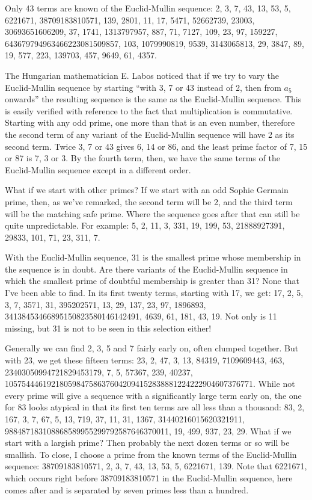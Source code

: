 \documentclass[12pt]{article}
\begin{document}
Only 43 terms are known of the Euclid-Mullin sequence: 2, 3, 7, 43, 13, 53, 5, 6221671, 38709183810571, 139, 2801, 11, 17, 5471, 52662739, 23003, 30693651606209, 37, 1741, 1313797957, 887, 71, 7127, 109, 23, 97, 159227, 643679794963466223081509857, 103, 1079990819, 9539, 3143065813, 29, 3847, 89, 19, 577, 223, 139703, 457, 9649, 61, 4357.

The Hungarian mathematician E. Labos noticed that if we try to vary the Euclid-Mullin sequence by starting ``with 3, 7 or 43 instead of 2, then from $a_5$ onwards'' the resulting sequence is the same as the Euclid-Mullin sequence. This is easily verified with reference to the fact that multiplication is commutative. Starting with any odd prime, one more than that is an even number, therefore the second term of any variant of the Euclid-Mullin sequence will have 2 as its second term. Twice 3, 7 or 43 gives 6, 14 or 86, and the least prime factor of 7, 15 or 87 is 7, 3 or 3. By the fourth term, then, we have the same terms of the Euclid-Mullin sequence except in a different order.

What if we start with other primes? If we start with an odd Sophie Germain prime, then, as we've remarked, the second term will be 2, and the third term will be the matching safe prime. Where the sequence goes after that can still be quite unpredictable. For example: 5, 2, 11, 3, 331, 19, 199, 53, 21888927391, 29833, 101, 71, 23, 311, 7.

With the Euclid-Mullin sequence, 31 is the smallest prime whose membership in the sequence is in doubt. Are there variants of the Euclid-Mullin sequence in which the smallest prime of doubtful membership is greater than 31? None that I've been able to find. In its first twenty terms, starting with 17, we get: 17, 2, 5, 3, 7, 3571, 31, 395202571, 13, 29, 137, 23, 97, 1896893, 34138453466895150823580146142491, 4639, 61, 181, 43, 19. Not only is 11 missing, but 31 is not to be seen in this selection either!

Generally we can find 2, 3, 5 and 7 fairly early on, often clumped together. But with 23, we get these fifteen terms: 23, 2, 47, 3, 13, 84319, 7109609443, 463, 23403050994721829453179, 7, 5, 57367, 239, 40237, 10575444619218059847586376042094152838881224222904607376771. While not every prime will give a sequence with a significantly large term early on, the one for 83 looks atypical in that its first ten terms are all less than a thousand: 83, 2, 167, 3, 7, 67, 5, 13, 719, 37, 11, 31, 1367, 31440216015620321911, 988487183108868589955299792587646370011, 19, 499, 937, 23, 29. What if we start with a largish prime? Then probably the next dozen terms or so will be smallish. To close, I choose a prime from the known terms of the Euclid-Mullin sequence: 38709183810571, 2, 3, 7, 43, 13, 53, 5, 6221671, 139. Note that 6221671, which occurs right before 38709183810571 in the Euclid-Mullin sequence, here comes after and is separated by seven primes less than a hundred.
\end{document}
